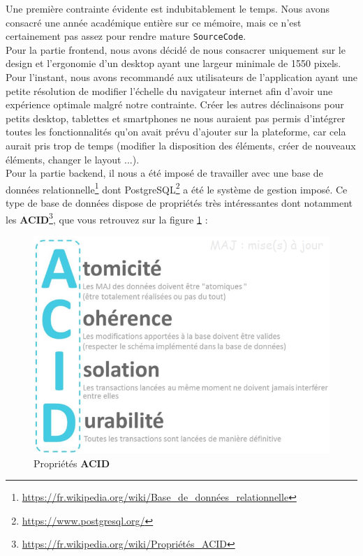 Une première contrainte évidente est indubitablement le temps. Nous avons consacré une année académique entière sur ce mémoire, mais ce n'est certainement pas assez pour rendre mature \texttt{SourceCode}.\\

Pour la partie \gls{frontend}, nous avons décidé de nous consacrer uniquement sur le design et l'ergonomie d'un desktop ayant une largeur minimale de 1550 pixels. Pour l'instant, nous avons recommandé aux utilisateurs de l'application ayant une petite résolution de modifier l'échelle du navigateur internet afin d'avoir une expérience optimale malgré notre contrainte. Créer les autres déclinaisons pour petits desktop, tablettes et smartphones ne nous auraient pas permis d'intégrer toutes les fonctionnalités qu'on avait prévu d'ajouter sur la plateforme, car cela aurait pris trop de temps (modifier la disposition des éléments, créer de nouveaux éléments, changer le layout ...). \\

Pour la partie \gls{backend}, il nous a été imposé de travailler avec une base de données relationnelle\footnote{
    \href{https://fr.wikipedia.org/wiki/Base\_de\_donn\%C3\%A9es\_relationnelle}
    {https://fr.wikipedia.org/wiki/Base\_de\_données\_relationnelle}
} dont PostgreSQL\footnote{
    \href{https://www.postgresql.org/}{https://www.postgresql.org/}
} a été le système de gestion imposé. Ce type de base de données dispose de propriétés très intéressantes dont notamment les \textbf{ACID}\footnote{
    \href{https://fr.wikipedia.org/wiki/Propri\%C3\%A9t\%C3\%A9s\_ACID}
    {https://fr.wikipedia.org/wiki/Propriétés\_ACID}
}, que vous retrouvez sur la figure \ref{pic:ACIDproperties} :

\begin{figure}[H]
    \includegraphics[width=\textwidth,height=\textheight,keepaspectratio]{images/cahierDesCharges/ACID.png}
    \centering
    \caption[Propriétés \textbf{ACID}]{Propriétés \textbf{ACID} \cite{bigdata_cap}}
    \label{pic:ACIDproperties}
\end{figure}

